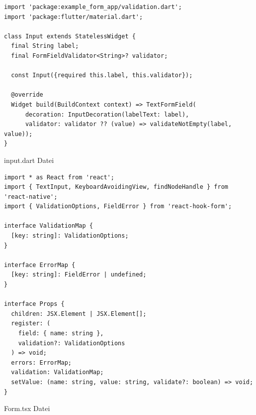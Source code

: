 \begin{listing}[H]
	\label{lst:quelltext4}

    \begin{verbatim}
import 'package:example_form_app/validation.dart';
import 'package:flutter/material.dart';

class Input extends StatelessWidget {
  final String label;
  final FormFieldValidator<String>? validator;

  const Input({required this.label, this.validator});

  @override
  Widget build(BuildContext context) => TextFormField(
	  decoration: InputDecoration(labelText: label),
	  validator: validator ?? (value) => validateNotEmpty(label, value));
}
    \end{verbatim}

    \caption[input.dart]{input.dart Datei}
\end{listing}













\begin{listing}[H]
	\label{lst:quelltext5}

    \begin{verbatim}
import * as React from 'react';
import { TextInput, KeyboardAvoidingView, findNodeHandle } from 'react-native';
import { ValidationOptions, FieldError } from 'react-hook-form';

interface ValidationMap {
  [key: string]: ValidationOptions;
}

interface ErrorMap {
  [key: string]: FieldError | undefined;
}

interface Props {
  children: JSX.Element | JSX.Element[];
  register: (
    field: { name: string },
    validation?: ValidationOptions
  ) => void;
  errors: ErrorMap;
  validation: ValidationMap;
  setValue: (name: string, value: string, validate?: boolean) => void;
}
\end{verbatim}


\caption[Form.tsx]{Form.tsx Datei}
\end{listing}

